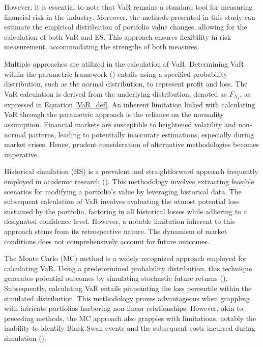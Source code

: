 However, it is essential to note that VaR remains a standard tool for measuring financial risk in the industry. Moreover, the methods presented in this study can estimate the empirical distribution of portfolio value changes, allowing for the calculation of both VaR and ES. This approach ensures flexibility in risk measurement, accommodating the strengths of both measures.

Multiple approaches are utilized in the calculation of VaR. Determining VaR within the parametric framework (\cite{hull2012risk}) entails using a specified probability distribution, such as the normal distribution, to represent profit and loss. The VaR calculation is derived from the underlying distribution, denoted as $F_{X_t}$, as expressed in Equation \eqref{VaR_def}. An inherent limitation linked with calculating VaR through the parametric approach is the reliance on the normality assumption. Financial markets are susceptible to heightened volatility and non-normal patterns, leading to potentially inaccurate estimations, especially during market crises. Hence, prudent consideration of alternative methodologies becomes imperative.

Historical simulation (HS) is a prevalent and straightforward approach frequently employed in academic research (\cite{hendricks1996evaluation}). This methodology involves extracting feasible scenarios for modifying a portfolio's value by leveraging historical data. The subsequent calculation of VaR involves evaluating the utmost potential loss sustained by the portfolio, factoring in all historical losses while adhering to a designated confidence level. However, a notable limitation inherent to this approach stems from its retrospective nature. The dynamism of market conditions does not comprehensively account for future outcomes.

The Monte Carlo (MC) method is a widely recognized approach employed for calculating VaR. Using a predetermined probability distribution, this technique generates potential outcomes by simulating stochastic future returns (\cite{hull2012risk}). Subsequently, calculating VaR entails pinpointing the loss percentile within the simulated distribution. This methodology proves advantageous when grappling with intricate portfolios harboring non-linear relationships. However, akin to preceding methods, the MC approach also grapples with limitations, notably the inability to identify Black Swan events and the subsequent costs incurred during simulation (\cite{hong2014monte}).

